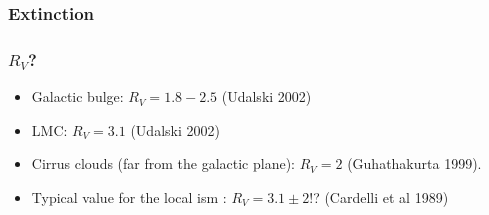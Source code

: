 \begin{frame}\frametitle{Extinction}

\begin{center}
\end{center}


\end{frame}
\begin{frame}\frametitle{$R_V$?}



\begin{itemize}
\item Galactic bulge: $R_V = 1.8-2.5$ (Udalski 2002)
\item LMC: $R_V=3.1 $ (Udalski 2002)
\item Cirrus clouds (far from the galactic plane):  $R_V=2 $ (Guhathakurta
1999).
\item Typical value for the local  {\sc ism} : $R_V = 3.1\pm 2$!?
(Cardelli et al 1989)
\end{itemize}


\end{frame}
